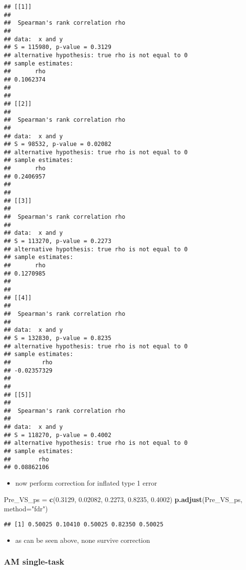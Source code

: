 \documentclass[]{article}
\newenvironment{Shaded}{\begin{snugshade}}{\end{snugshade}}
\newcommand{\KeywordTok}[1]{\textcolor[rgb]{0.13,0.29,0.53}{\textbf{#1}}}
\newcommand{\DataTypeTok}[1]{\textcolor[rgb]{0.13,0.29,0.53}{#1}}
\newcommand{\FloatTok}[1]{\textcolor[rgb]{0.00,0.00,0.81}{#1}}
\newcommand{\StringTok}[1]{\textcolor[rgb]{0.31,0.60,0.02}{#1}}
\newcommand{\NormalTok}[1]{#1}
\providecommand{\tightlist}{%
  \setlength{\itemsep}{0pt}\setlength{\parskip}{0pt}}
\begin{document}
\begin{verbatim}
## [[1]]
## 
##  Spearman's rank correlation rho
## 
## data:  x and y
## S = 115980, p-value = 0.3129
## alternative hypothesis: true rho is not equal to 0
## sample estimates:
##       rho 
## 0.1062374 
## 
## 
## [[2]]
## 
##  Spearman's rank correlation rho
## 
## data:  x and y
## S = 98532, p-value = 0.02082
## alternative hypothesis: true rho is not equal to 0
## sample estimates:
##       rho 
## 0.2406957 
## 
## 
## [[3]]
## 
##  Spearman's rank correlation rho
## 
## data:  x and y
## S = 113270, p-value = 0.2273
## alternative hypothesis: true rho is not equal to 0
## sample estimates:
##       rho 
## 0.1270985 
## 
## 
## [[4]]
## 
##  Spearman's rank correlation rho
## 
## data:  x and y
## S = 132830, p-value = 0.8235
## alternative hypothesis: true rho is not equal to 0
## sample estimates:
##         rho 
## -0.02357329 
## 
## 
## [[5]]
## 
##  Spearman's rank correlation rho
## 
## data:  x and y
## S = 118270, p-value = 0.4002
## alternative hypothesis: true rho is not equal to 0
## sample estimates:
##        rho 
## 0.08862106
\end{verbatim}

\begin{itemize}
\tightlist
\item
  now perform correction for inflated type 1 error
\end{itemize}

\begin{Shaded}
\begin{Highlighting}[]
\NormalTok{Pre_VS_ps =}\StringTok{ }\KeywordTok{c}\NormalTok{(}\FloatTok{0.3129}\NormalTok{, }\FloatTok{0.02082}\NormalTok{, }\FloatTok{0.2273}\NormalTok{, }\FloatTok{0.8235}\NormalTok{, }\FloatTok{0.4002}\NormalTok{)}
\KeywordTok{p.adjust}\NormalTok{(Pre_VS_ps, }\DataTypeTok{method=}\StringTok{"fdr"}\NormalTok{)}
\end{Highlighting}
\end{Shaded}

\begin{verbatim}
## [1] 0.50025 0.10410 0.50025 0.82350 0.50025
\end{verbatim}

\begin{itemize}
\tightlist
\item
  as can be seen above, none survive correction
\end{itemize}

\subsubsection{AM single-task}\label{am-single-task}
\end{document}
